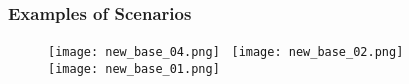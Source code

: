\documentclass{beamer}
\begin{document}

		\begin{frame}\frametitle{Examples of Scenarios}
			\begin{figure}[htb!]
				\centering
				\texttt{[image: new\_base\_04.png]}~
				\texttt{[image: new\_base\_02.png]}\\
				\vspace{.5mm}
				\texttt{[image: new\_base\_01.png]}
				\label{fig:scenarios1}
			\end{figure}
		\end{frame}
\end{document}
